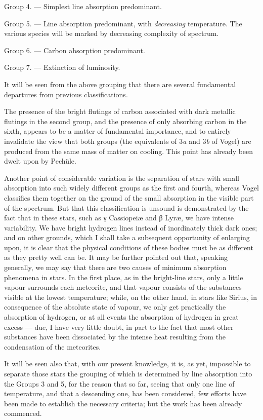 \documentclass[a4paper, 12pt, oneside, polutonikogreek, english]{article}
\begin{document}
Group 4. --- Simplest line absorption predominant.

Group 5. --- Line absorption predominant, with \emph{decreasing} temperature. The various species will be marked by decreasing complexity of spectrum.

Group 6. --- Carbon absorption predominant.

Group 7. --- Extinction of luminosity.

It will be seen from the above grouping that there are several fundamental departures from previous classifications.

The presence of the bright flutings of carbon associated with dark metallic flutings in the second group, and the presence of only absorbing carbon in the sixth, appears to be a matter of fundamental importance, and to entirely invalidate the view that both groups (the equivalents of 3\emph{a} and 3\emph{b} of Vogel) are produced from the same mass of matter on cooling. This point has already been dwelt upon by Pechüle.

Another point of considerable variation is the separation of stars with small absorption into such widely different groups as the first and fourth, whereas Vogel classifies them together on the ground of the small absorption in the visible part of the spectrum. But that this classification is unsound is demonstrated by the fact that in these stars, such as γ Cassiopeiæ and β Lyræ, we have intense variability. We have bright hydrogen lines instead of inordinately thick dark ones; and on other grounds, which I shall take a subsequent opportunity of enlarging upon, it is clear that the physical conditions of these bodies must be as different as they pretty well can be. It may be further pointed out that, speaking generally, we may say that there are two causes of minimum absorption phenomena in stars. In the first place, as in the bright-line stars, only a little vapour surrounds each meteorite, and that vapour consists of the substances visible at the lowest temperature; while, on the other hand, in stars like Sirius, in consequence of the absolute state of vapour, we only get practically the absorption of hydrogen, or at all events the absorption of hydrogen in great excess --- due, I have very little doubt, in part to the fact that most other substances have been dissociated by the intense heat resulting from the condensation of the meteorites.

It will be seen also that, with our present knowledge, it is, as yet, impossible to separate those stars the grouping of which is determined by line absorption into the Groups 3 and 5, for the reason that so far, seeing that only one line of temperature, and that a descending one, has been considered, few efforts have been made to establish the necessary criteria; but the work has been already commenced.
\end{document}
